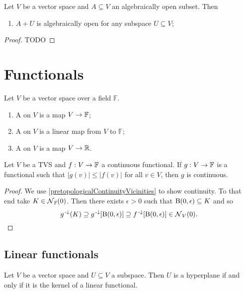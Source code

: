 \begin{proposition} \label{algebraicallyOpen}
Let $V$ be a vector space and $A \subseteq V$ an algebraically open subset. Then
\begin{enumerate}
\item $A+U$ is algebraically open for any subspace $U\subseteq V$;
\end{enumerate}
\end{proposition}
\begin{proof}
TODO
\end{proof}




\section{Functionals}
\begin{definition}
Let $V$ be a vector space over a field $\mathbb{F}$.
\begin{enumerate}
\item A  on $V$ is a map $V\to \mathbb{F}$;
\item A  on $V$ is a linear map from $V$ to $\mathbb{F}$;
\item A  on $V$ is a map $V\to \mathbb{R}$.
\end{enumerate}
\end{definition}

\begin{lemma} \label{continuityDominatedFunctional}
Let $V$ be a TVS and $f:V\to \mathbb{F}$ a continuous functional. If $g:V\to \mathbb{F}$ is a functional such that $|g(v)|\leq |f(v)|$ for all $v\in V$, then $g$ is continuous.
\end{lemma}
\begin{proof}
We use \ref{pretopologicalContinuityVicinities} to show continuity. To that end take $K\in \operatorname{\mathcal{N}}_{\mathbb{F}}(0)$. Then there exists $\epsilon >0$ such that $\operatorname{B}(0,\epsilon)\subseteq K$ and so
\[ g^{{\text{\hspace{0.15em}-}\downarrow}}(K) \supseteq g^{\text{\hspace{0.15em}-}\downarrow}[\operatorname{B}(0,\epsilon)] \supseteq f^{\text{\hspace{0.15em}-}\downarrow}[\operatorname{B}(0,\epsilon)] \in \operatorname{\mathcal{N}}_V(0). \]
\end{proof}

\subsection{Linear functionals}
\begin{lemma} \label{kernelHyperplane}
Let $V$ be a vector space and $U\subseteq V$ a subspace. Then $U$ is a hyperplane \textup{if and only if} it is the kernel of a linear functional.
\end{lemma}

